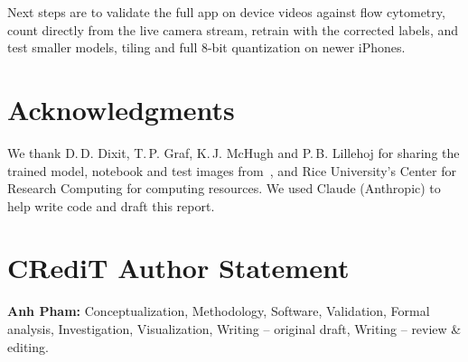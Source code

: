 \documentclass[conference]{IEEEtran}
\begin{document}
Next steps are to validate the full app on device videos against flow cytometry, count directly from the live camera stream, retrain with the corrected labels, and test smaller models, tiling and full 8-bit quantization on newer iPhones.

\section*{Acknowledgments}
We thank D.\,D. Dixit, T.\,P. Graf, K.\,J. McHugh and P.\,B. Lillehoj for sharing the trained model, notebook and test images from~\cite{dixit2025}, and Rice University's Center for Research Computing for computing resources. We used Claude (Anthropic) to help write code and draft this report.

\section*{CRediT Author Statement}
\textbf{Anh Pham:} Conceptualization, Methodology, Software, Validation, Formal analysis, Investigation, Visualization, Writing -- original draft, Writing -- review \& editing.



\end{document}
